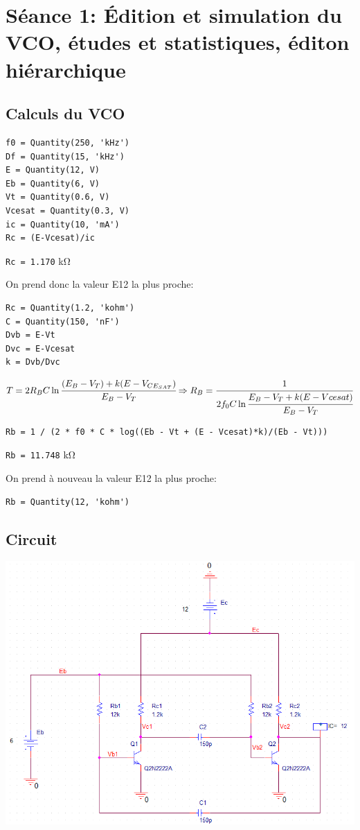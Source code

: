 \section{Séance 1: Édition et simulation du VCO, études et statistiques, éditon hiérarchique}
\subsection{Calculs du VCO}
\begin{verbatim}
f0 = Quantity(250, 'kHz')
Df = Quantity(15, 'kHz')
E = Quantity(12, V)
Eb = Quantity(6, V)
Vt = Quantity(0.6, V)
Vcesat = Quantity(0.3, V)
ic = Quantity(10, 'mA')
Rc = (E-Vcesat)/ic
\end{verbatim}
\verb|Rc = 1.170| \si{\kilo\ohm}

On prend donc la valeur E12 la plus proche:
\begin{verbatim}
Rc = Quantity(1.2, 'kohm')
C = Quantity(150, 'nF')
Dvb = E-Vt
Dvc = E-Vcesat
k = Dvb/Dvc
\end{verbatim}

$T = 2 R_B C \ln\cfrac{(E_B -V_T)+k(E-V_{CE_{SAT}})}{E_B-V_T} \Rightarrow R_B = \cfrac{1}{2 f_0 C \ln\cfrac{E_B - V_T + k(E -Vcesat)}{E_B-V_T}}$
\begin{verbatim}
Rb = 1 / (2 * f0 * C * log((Eb - Vt + (E - Vcesat)*k)/(Eb - Vt)))
\end{verbatim}
\verb|Rb = 11.748| \si{\kilo\ohm}

On prend à nouveau la valeur E12 la plus proche:
\begin{verbatim}
Rb = Quantity(12, 'kohm')
\end{verbatim}
\subsection{Circuit}

\includegraphics[width=\linewidth]{../img/schematic_vco.png}

